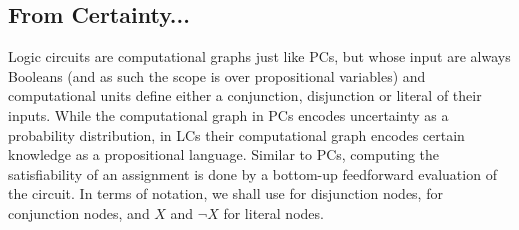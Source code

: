 \subsection{From Certainty...}
\label{sec:fromcertainty}

Logic circuits are computational graphs just like PCs, but whose input are always Booleans (and as
such the scope is over propositional variables) and computational units define either a
conjunction, disjunction or literal of their inputs. While the computational graph in PCs encodes
uncertainty as a probability distribution, in LCs their computational graph encodes certain
knowledge as a propositional language. Similar to PCs, computing the satisfiability of an
assignment is done by a bottom-up feedforward evaluation of the circuit. In terms of notation, we
shall use \inode{\newOrNode} for disjunction nodes, \inode{\newAndNode} for conjunction nodes, and
$X$ and $\neg X$ for literal nodes.

